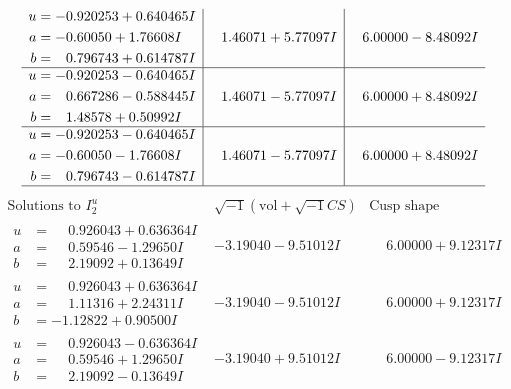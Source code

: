 \documentclass[1p]{elsarticle_modified}
\theoremstyle{definition}
\newcommand{\I}{\sqrt{-1}}
\begin{document}
$$\begin{array}{c|c|c}
\begin{aligned}
u &= -0.920253 + 0.640465 I \\
a &= -0.60050 + 1.76608 I \\
b &= \phantom{-}0.796743 + 0.614787 I\end{aligned}
 & \phantom{-}1.46071 + 5.77097 I & \phantom{-}6.00000 - 8.48092 I \\ \hline\begin{aligned}
u &= -0.920253 - 0.640465 I \\
a &= \phantom{-}0.667286 - 0.588445 I \\
b &= \phantom{-}1.48578 + 0.50992 I\end{aligned}
 & \phantom{-}1.46071 - 5.77097 I & \phantom{-}6.00000 + 8.48092 I \\ \hline\begin{aligned}
u &= -0.920253 - 0.640465 I \\
a &= -0.60050 - 1.76608 I \\
b &= \phantom{-}0.796743 - 0.614787 I\end{aligned}
 & \phantom{-}1.46071 - 5.77097 I & \phantom{-}6.00000 + 8.48092 I\\
 \hline 
 \end{array}$$\newpage$$\begin{array}{c|c|c}  
\text{Solutions to }I^u_{2}& \I (\text{vol} + \sqrt{-1}CS) & \text{Cusp shape}\\
 \hline 
\begin{aligned}
u &= \phantom{-}0.926043 + 0.636364 I \\
a &= \phantom{-}0.59546 - 1.29650 I \\
b &= \phantom{-}2.19092 + 0.13649 I\end{aligned}
 & -3.19040 - 9.51012 I & \phantom{-}6.00000 + 9.12317 I \\ \hline\begin{aligned}
u &= \phantom{-}0.926043 + 0.636364 I \\
a &= \phantom{-}1.11316 + 2.24311 I \\
b &= -1.12822 + 0.90500 I\end{aligned}
 & -3.19040 - 9.51012 I & \phantom{-}6.00000 + 9.12317 I \\ \hline\begin{aligned}
u &= \phantom{-}0.926043 - 0.636364 I \\
a &= \phantom{-}0.59546 + 1.29650 I \\
b &= \phantom{-}2.19092 - 0.13649 I\end{aligned}
 & -3.19040 + 9.51012 I & \phantom{-}6.00000 - 9.12317 I \\ \hline\begin{aligned}

\end{aligned}
\end{array}$$
\end{document}
